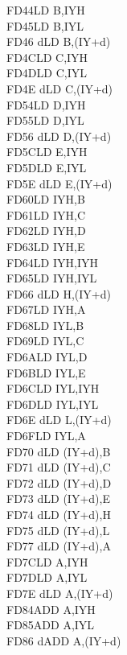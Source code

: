 \documentclass[12pt,twoside,openright,a4paper]{book}
\begin{document}
\begin{multicols}{3}
{\begin{tabbing}
	FD44\>LD B,IYH\UNDOC\\
	FD45\>LD B,IYL\UNDOC\\
	FD46 d\>LD B,(IY+d)\\
	FD4C\>LD C,IYH\UNDOC\\
	FD4D\>LD C,IYL\UNDOC\\
	FD4E d\>LD C,(IY+d)\\
	FD54\>LD D,IYH\UNDOC\\
	FD55\>LD D,IYL\UNDOC\\
	FD56 d\>LD D,(IY+d)\\
	FD5C\>LD E,IYH\UNDOC\\
	FD5D\>LD E,IYL\UNDOC\\
	FD5E d\>LD E,(IY+d)\\
	FD60\>LD IYH,B\UNDOC\\
	FD61\>LD IYH,C\UNDOC\\
	FD62\>LD IYH,D\UNDOC\\
	FD63\>LD IYH,E\UNDOC\\
	FD64\>LD IYH,IYH\UNDOC\\
	FD65\>LD IYH,IYL\UNDOC\\
	FD66 d\>LD H,(IY+d)\\
	FD67\>LD IYH,A\UNDOC\\
	FD68\>LD IYL,B\UNDOC\\
	FD69\>LD IYL,C\UNDOC\\
	FD6A\>LD IYL,D\UNDOC\\
	FD6B\>LD IYL,E\UNDOC\\
	FD6C\>LD IYL,IYH\UNDOC\\
	FD6D\>LD IYL,IYL\UNDOC\\
	FD6E d\>LD L,(IY+d)\\
	FD6F\>LD IYL,A\UNDOC\\
	FD70 d\>LD (IY+d),B\\
	FD71 d\>LD (IY+d),C\\
	FD72 d\>LD (IY+d),D\\
	FD73 d\>LD (IY+d),E\\
	FD74 d\>LD (IY+d),H\\
	FD75 d\>LD (IY+d),L\\
	FD77 d\>LD (IY+d),A\\
	FD7C\>LD A,IYH\UNDOC\\
	FD7D\>LD A,IYL\UNDOC\\
	FD7E d\>LD A,(IY+d)\\
	FD84\>ADD A,IYH\UNDOC\\
	FD85\>ADD A,IYL\UNDOC\\
	FD86 d\>ADD A,(IY+d)\\

\end{tabbing}}
\end{multicols}
\end{document}
